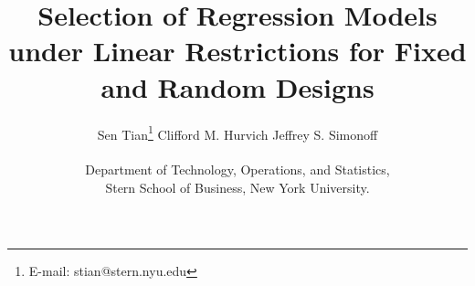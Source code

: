 \documentclass{article}
\begin{document}
\def\spacingset#1{\renewcommand{\baselinestretch}%
{#1}\small\normalsize} \spacingset{1}


\title{\bf Selection of Regression Models under Linear Restrictions for Fixed and Random Designs}
\author{Sen Tian\footnote{E-mail: stian@stern.nyu.edu} \quad Clifford M. Hurvich  \quad Jeffrey S. Simonoff \\\\
  Department of Technology, Operations, and Statistics, \\Stern School of Business, New York University.}
\date{}
\maketitle








\clearpage

%



\end{document}
